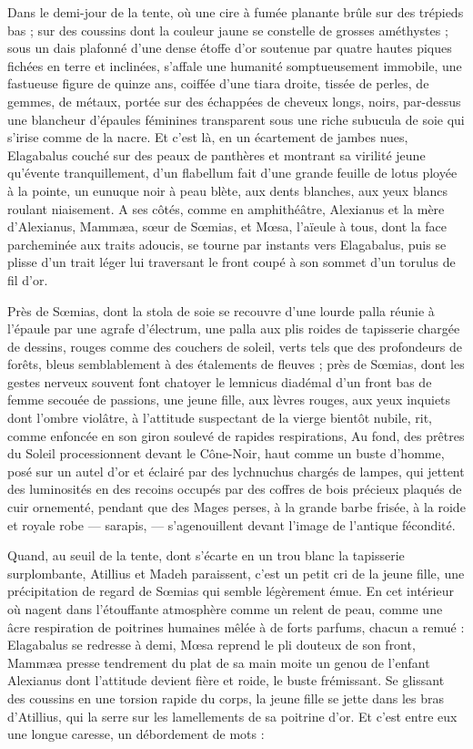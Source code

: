\documentclass[a4paper, 11pt, oneside, polutonikogreek, french]{article}
\begin{document}
Dans le demi-jour de la tente, où une cire à fumée planante brûle sur des trépieds bas ; sur des coussins dont la couleur jaune se constelle de grosses améthystes ; sous un dais plafonné d'une dense étoffe d'or soutenue par quatre hautes piques fichées en terre et inclinées, s'affale une humanité somptueusement immobile, une fastueuse figure de quinze ans, coiffée d'une tiara droite, tissée de perles, de gemmes, de métaux, portée sur des échappées de cheveux longs, noirs, par-dessus une blancheur d'épaules féminines transparent sous une riche subucula de soie qui s'irise comme de la nacre. Et c'est là, en un écartement de jambes nues, Elagabalus couché sur des peaux de panthères et montrant sa virilité jeune qu'évente tranquillement, d'un flabellum fait d'une grande feuille de lotus ployée à la pointe, un eunuque noir à peau blète, aux dents blanches, aux yeux blancs roulant niaisement. A ses côtés, comme en amphithéâtre, Alexianus et la mère d'Alexianus, Mammæa, sœur de Sœmias, et Mœsa, l'aïeule à tous, dont la face parcheminée aux traits adoucis, se tourne par instants vers Elagabalus, puis se plisse d'un trait léger lui traversant le front coupé à son sommet d'un torulus de fil d'or.

Près de Sœmias, dont la stola de soie se recouvre d'une lourde palla réunie à l'épaule par une agrafe d'électrum, une palla aux plis roides de tapisserie chargée de dessins, rouges comme des couchers de soleil, verts tels que des profondeurs de forêts, bleus semblablement à des étalements de fleuves ; près de Sœmias, dont les gestes nerveux souvent font chatoyer le lemnicus diadémal d'un front bas de femme secouée de passions, une jeune fille, aux lèvres rouges, aux yeux inquiets dont l'ombre violâtre, à l'attitude suspectant de la vierge bientôt nubile, rit, comme enfoncée en son giron soulevé de rapides respirations, Au fond, des prêtres du Soleil processionnent devant le Cône-Noir, haut comme un buste d'homme, posé sur un autel d'or et éclairé par des lychnuchus chargés de lampes, qui jettent des luminosités en des recoins occupés par des coffres de bois précieux plaqués de cuir ornementé, pendant que des Mages perses, à la grande barbe frisée, à la roide et royale robe --- sarapis, --- s'agenouillent devant l'image de l'antique fécondité.

Quand, au seuil de la tente, dont s'écarte en un trou blanc la tapisserie surplombante, Atillius et Madeh paraissent, c'est un petit cri de la jeune fille, une précipitation de regard de Sœmias qui semble légèrement émue. En cet intérieur où nagent dans l'étouffante atmosphère comme un relent de peau, comme une âcre respiration de poitrines humaines mêlée à de forts parfums, chacun a remué : Elagabalus se redresse à demi, Mœsa reprend le pli douteux de son front, Mammæa presse tendrement du plat de sa main moite un genou de l'enfant Alexianus dont l'attitude devient fière et roide, le buste frémissant. Se glissant des coussins en une torsion rapide du corps, la jeune fille se jette dans les bras d'Atillius, qui la serre sur les lamellements de sa poitrine d'or. Et c'est entre eux une longue caresse, un débordement de mots :
\end{document}
